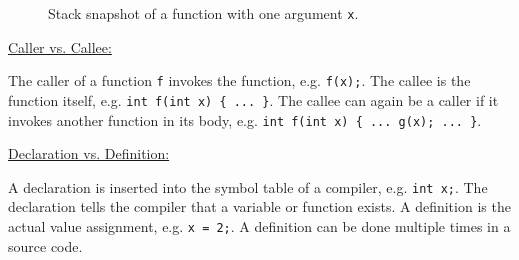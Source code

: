 \par{
	\noindent
	\begin{figure}[!htb]
		\centering
		\caption{Stack snapshot of a function with one argument \texttt{x}.}
		\label{fig:memsnapshotfunc}
	\end{figure}
}
\clearpage

\par{
	\noindent
	\underline{Caller vs. Callee:}
	\par{
		\noindent
		The caller of a function \texttt{f} invokes the function, e.g. \texttt{f(x);}. \newline
		The callee is the function itself, e.g. \texttt{int f(int x) \{ ... \}}. \newline
		The callee can again be a caller if it invokes another function in its body, \newline e.g. \texttt{int f(int x) \{ ... g(x); ... \}}.
	}
}

\par{
	\noindent
	\underline{Declaration vs. Definition:}
	\par{
		\noindent	
		A declaration is inserted into the symbol table of a compiler, e.g. \texttt{int x;}. The declaration tells the compiler that a variable or function exists. \newline
		A definition is the actual value assignment, e.g. \texttt{x = 2;}. A definition can be done multiple times in a source code.
	}
}

